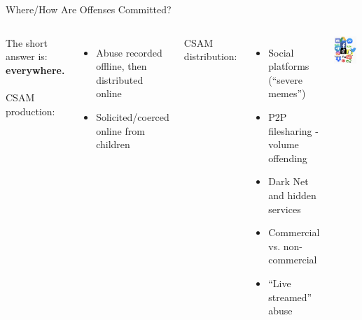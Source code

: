 \documentclass[nobackground,dvipsnames,table,aspectratio=169]{beamer}
\begin{document}
\begin{frame}{Where/How Are Offenses Committed?}
    \begin{columns}
            The short answer is: \textbf{everywhere.}\\~\\
            CSAM production:
            \begin{itemize}
                \item Abuse recorded offline, then distributed online
                \item Solicited/coerced online from children
            \end{itemize}
            CSAM distribution:
            \begin{itemize}
                \item Social platforms (“severe memes”)
                \item P2P filesharing - volume offending
                \item Dark Net and hidden services
                \item Commercial vs. non-commercial
                \item “Live streamed” abuse
            \end{itemize}
            \includegraphics[width=0.9\textwidth]{everywhere}
    \end{columns}
\end{frame}
\end{document}

